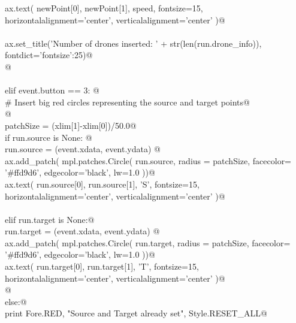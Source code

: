 \documentclass[12.0pt]{report}
\begin{document}
\begin{flushleft}
\begin{list}{}{}
\mbox{}\verb@                 ax.text( newPoint[0], newPoint[1], speed, fontsize=15, horizontalalignment='center', verticalalignment='center' )@\\
\mbox{}\verb@@\\
\mbox{}\verb@                 ax.set_title('Number of drones inserted: ' + str(len(run.drone_info)), fontdict={'fontsize':25})@\\
\mbox{}\verb@                 @\\
\mbox{}\verb@@\\
\mbox{}\verb@             elif event.button == 3:  @\\
\mbox{}\verb@                 # Insert big red circles representing the source and target points@\\
\mbox{}\verb@    @\\
\mbox{}\verb@                 patchSize  = (xlim[1]-xlim[0])/50.0@\\
\mbox{}\verb@                 if run.source is None:    @\\
\mbox{}\verb@                      run.source = (event.xdata, event.ydata)  @\\
\mbox{}\verb@                      ax.add_patch( mpl.patches.Circle( run.source, radius = patchSize, facecolor= '#ffd9d6', edgecolor='black', lw=1.0 ))@\\
\mbox{}\verb@                      ax.text( run.source[0], run.source[1], 'S', fontsize=15, horizontalalignment='center', verticalalignment='center' )@\\
\mbox{}\verb@@\\
\mbox{}\verb@                 elif run.target is None:@\\
\mbox{}\verb@                      run.target = (event.xdata, event.ydata)  @\\
\mbox{}\verb@                      ax.add_patch( mpl.patches.Circle( run.target, radius = patchSize, facecolor= '#ffd9d6', edgecolor='black', lw=1.0 ))@\\
\mbox{}\verb@                      ax.text( run.target[0], run.target[1], 'T', fontsize=15, horizontalalignment='center', verticalalignment='center' )@\\
\mbox{}\verb@    @\\
\mbox{}\verb@                 else:@\\
\mbox{}\verb@                       print Fore.RED, "Source and Target already set", Style.RESET_ALL@\\
\mbox{}\verb@@\\
\mbox{}\verb@@\\

\end{list}
\end{flushleft}
\end{document}
